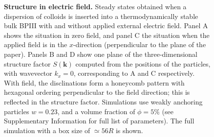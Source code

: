 \documentclass[12pt]{article}
\begin{document}
\begin{figure}
\begin{center}
\end{center}
\caption{\textbf{Structure in electric field.}
Steady states obtained when a dispersion of colloids is inserted
into a thermodynamically stable bulk BPIII with and without applied
external electric field. Panel A shows the situation in zero field, and panel
C the situation when the applied field is in the $x$-direction
(perpendicular to the plane of the paper). Panels B and D show one
plane of the three-dimensional structure factor $S(\mathbf{k})$ computed
from the positions of the particles, with wavevector $k_x = 0$, corresponding
to A and C respectively. With field, the disclinations form a honeycomb
pattern with hexagonal ordering perpendicular to the field direction;
this is reflected in the structure factor.
Simulations use weakly anchoring particles $w=0.23$, and a volume
fraction of $\phi=5\%$ (see Supplementary Information for full list of
parameters).
The full simulation with a box size of $\simeq 56R$ is shown.}
\end{figure}
\end{document}
